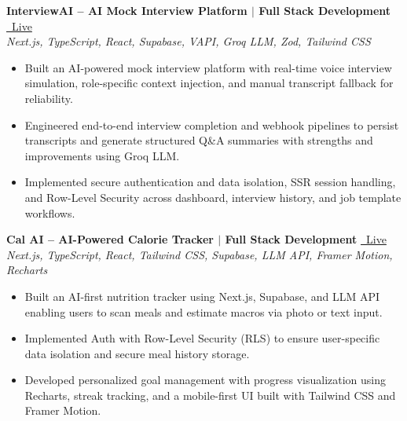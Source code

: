 \documentclass[a4paper,9pt]{article}
\begin{document}
\vspace{2pt}

\textbf{InterviewAI -- AI Mock Interview Platform $|$ Full Stack Development}
\hfill \href{https://eightfold-interview.vercel.app/}{\faExternalLinkAlt\ Live} \\
\textit{Next.js, TypeScript, React, Supabase, VAPI, Groq LLM, Zod, Tailwind CSS}
\vspace{-4pt}
\begin{itemize}[noitemsep, topsep=0pt, leftmargin=*]
    \item Built an AI-powered mock interview platform with real-time voice interview simulation, role-specific context injection, and manual transcript fallback for reliability.
    \item Engineered end-to-end interview completion and webhook pipelines to persist transcripts and generate structured Q\&A summaries with strengths and improvements using Groq LLM.
    \item Implemented secure authentication and data isolation, SSR session handling, and Row-Level Security across dashboard, interview history, and job template workflows.
\end{itemize}

\vspace{2pt}

\textbf{Cal AI -- AI-Powered Calorie Tracker $|$ Full Stack Development}
\hfill \href{https://cal-ai.anvesh.dev/}{\faExternalLinkAlt\ Live} \\
\textit{Next.js, TypeScript, React, Tailwind CSS, Supabase, LLM API, Framer Motion, Recharts}
\vspace{-4pt}
\begin{itemize}[noitemsep, topsep=0pt, leftmargin=*]
    \item Built an AI-first nutrition tracker using Next.js, Supabase, and LLM API enabling users to scan meals and estimate macros via photo or text input.
    \item Implemented Auth with Row-Level Security (RLS) to ensure user-specific data isolation and secure meal history storage.
    \item Developed personalized goal management with progress visualization using Recharts, streak tracking, and a mobile-first UI built with Tailwind CSS and Framer Motion.
\end{itemize}

\vspace{5pt}

\end{document}
